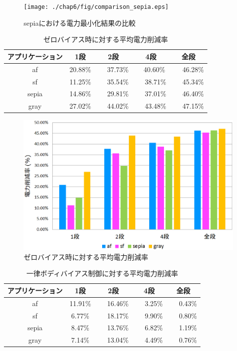 {\begin{figure}[h]
\centering
\texttt{[image: ./chap6/fig/comparison\_sepia.eps]}
\caption{sepiaにおける電力最小化結果の比較}
\label{fig:comparison_af}
\end{figure}

\begin{table}[h]
\centering
\caption{ゼロバイアス時に対する平均電力削減率}
\label{table:reduction_vs_zero_bias}
\begin{tabular}{|c|c|c|c|c|}\hline
アプリケーション & 1段 & 2段 & 4段 & 全段 \\ \hline \hline
af & 20.88\% & 　	37.73\% & 　40.60\% & 　	46.28\% \\ \hline
sf & 11.25\% & 　	35.54\% & 　	38.71\% & 　	45.34\% \\ \hline
sepia & 14.86\% & 　	29.81\% & 　	37.01\% & 　	46.40\% \\ \hline
gray & 27.02\% & 　	44.02\% & 　	43.48\% & 　	47.15\% \\ \hline
\end{tabular}
\end{table}

\begin{figure}[h]
\centering
\includegraphics[clip, width=14cm]{./chap6/fig/reduction_vs_zero_bias.eps}
\caption{ゼロバイアス時に対する平均電力削減率}
\label{fig:reduction_vs_zero_bias}
\end{figure}

\begin{table}[h]
\centering
\caption{一律ボディバイアス制御に対する平均電力削減率}
\label{table:reduction_vs_uniform}
\begin{tabular}{|c|c|c|c|c|} \hline
アプリケーション & 1段 & 2段 & 4段 & 全段 \\ \hline \hline
af & 11.91\% & 　	16.46\% & 　	3.25\% & 　	0.43\% \\ \hline
sf & 6.77\% & 　	18.17\% & 　	9.90\% & 　	0.80\% \\ \hline
sepia & 8.47\% & 　	13.76\% & 　	6.82\% & 　	1.19\% \\ \hline
gray & 7.14\% & 　	13.04\% & 　	4.49\% & 　	0.76\% \\ \hline
\end{tabular}
\end{table}

}
